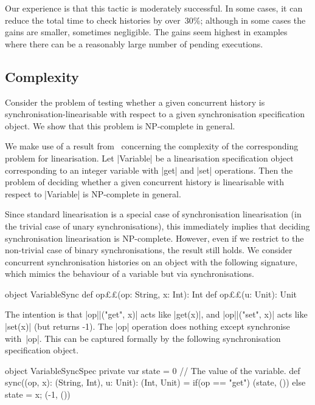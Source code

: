 Our experience is that this tactic is moderately successful.  In some cases,
it can reduce the total time to check histories by over~30\%;
although in some cases the gains are smaller, sometimes negligible.  The gains
seem highest in examples where there can be a reasonably large number of
pending executions.
 

\subsection{Complexity}
\label{sec:NP-complete}

Consider the problem of testing whether a given concurrent history is
synchronisation-linearisable with respect to a given synchronisation
specification object.  We show that this problem is NP-complete in general.

We make use of a result from~\cite{gibbons-korach} concerning the complexity
of the corresponding problem for linearisation.  Let |Variable| be a
linearisation specification object corresponding to an integer variable with
|get| and |set| operations.  Then the problem of deciding whether a given
concurrent history is linearisable with respect to |Variable| is NP-complete
in general.

Since standard linearisation is a special case of synchronisation
linearisation (in the trivial case of unary synchronisations), this
immediately implies that deciding synchronisation linearisation is
NP-complete.  However, even if we restrict to the non-trivial case of binary
synchronisations, the result still holds.
%
We consider concurrent synchronisation histories on an object with the
following signature, which mimics the behaviour of a variable but via
synchronisations. 
%
\begin{scala}
object VariableSync{
  def op££(op: String, x: Int): Int
  def op££(u: Unit): Unit
} 
\end{scala}
%
The intention is that |op||("get", x)| acts like |get(x)|, and
|op||("set", x)| acts like |set(x)| (but returns -1).  The |op|
operation does nothing except synchronise with~|op|.  This
can be captured formally by the following synchronisation specification
object.
%
\begin{scala}
object VariableSyncSpec{
  private var state = 0   // The value of the variable.
  def sync((op, x): (String, Int), u: Unit): (Int, Unit) = 
    if(op == "get") (state, ()) else{ state = x; (-1, ()) }
}
\end{scala}

